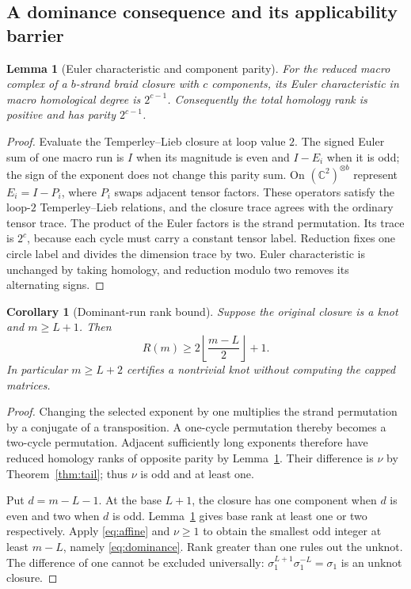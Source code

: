 \documentclass[11pt]{article}
\newtheorem{lemma}[theorem]{Lemma}
\newtheorem{corollary}[theorem]{Corollary}
\theoremstyle{definition}
\theoremstyle{remark}
\begin{document}
\subsection{A dominance consequence and its applicability barrier}
\begin{lemma}[Euler characteristic and component parity]
\label{lem:euler}
For the reduced macro complex of a $b$-strand braid closure with $c$ components, its Euler characteristic in macro homological degree is $2^{c-1}$. Consequently the total homology rank is positive and has parity $2^{c-1}$.
\end{lemma}
\begin{proof}
Evaluate the Temperley--Lieb closure at loop value $2$. The signed Euler sum of one macro run is $I$ when its magnitude is even and $I-E_i$ when it is odd; the sign of the exponent does not change this parity sum. On $(\mathbb C^2)^{\otimes b}$ represent $E_i=I-P_i$, where $P_i$ swaps adjacent tensor factors. These operators satisfy the loop-$2$ Temperley--Lieb relations, and the closure trace agrees with the ordinary tensor trace. The product of the Euler factors is the strand permutation. Its trace is $2^c$, because each cycle must carry a constant tensor label. Reduction fixes one circle label and divides the dimension trace by two. Euler characteristic is unchanged by taking homology, and reduction modulo two removes its alternating signs.
\end{proof}

\begin{corollary}[Dominant-run rank bound]
\label{cor:dominance}
Suppose the original closure is a knot and $m\ge L+1$. Then
\begin{equation}
 R(m)\ge 2\left\lfloor\frac{m-L}{2}\right\rfloor+1.
 \label{eq:dominance}
\end{equation}
In particular $m\ge L+2$ certifies a nontrivial knot without computing the capped matrices.
\end{corollary}
\begin{proof}
Changing the selected exponent by one multiplies the strand permutation by a conjugate of a transposition. A one-cycle permutation thereby becomes a two-cycle permutation. Adjacent sufficiently long exponents therefore have reduced homology ranks of opposite parity by Lemma~\ref{lem:euler}. Their difference is $\nu$ by Theorem~\ref{thm:tail}; thus $\nu$ is odd and at least one.

Put $d=m-L-1$. At the base $L+1$, the closure has one component when $d$ is even and two when $d$ is odd. Lemma~\ref{lem:euler} gives base rank at least one or two respectively. Apply \eqref{eq:affine} and $\nu\ge1$ to obtain the smallest odd integer at least $m-L$, namely \eqref{eq:dominance}. Rank greater than one rules out the unknot. The difference of one cannot be excluded universally: $\sigma_1^{L+1}\sigma_1^{-L}=\sigma_1$ is an unknot closure.
\end{proof}
\end{document}
